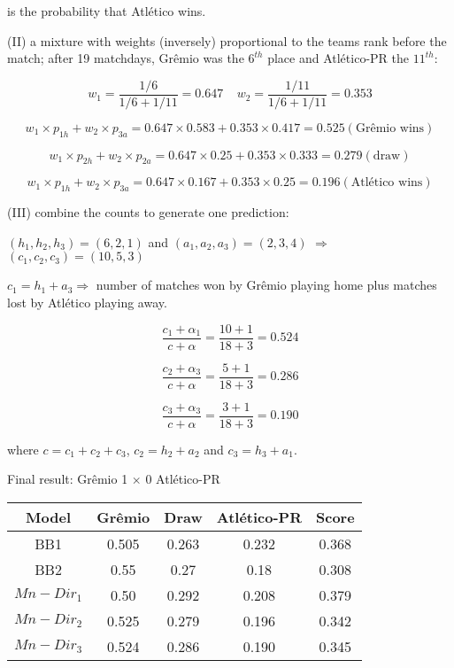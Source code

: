 \documentclass[journal,article,accept,moreauthors,pdftex,12pt,a4paper]{mdpi}
\begin{document}
\noindent
is the probability that Atl\'etico wins.


(II) a mixture with weights (inversely) proportional to the teams rank before the match; 
after 19 matchdays, Gr\^emio was the $6^{th}$ place and Atl\'etico-PR the $11^{th}$:


\[w_1 = \frac{1/6}{1/6+1/11}=0.647 ~ ~ ~ ~ ~ w_2 = \frac{1/11}{1/6+1/11}=0.353\]


\[
w_1\times p_{1h}+w_2\times p_{3a}=0.647\times0.583+0.353\times0.417=0.525 (\text{Gr\^emio wins})
\]

\[
w_1\times p_{2h}+w_2\times p_{2a}=0.647\times0.25+0.353\times0.333=0.279 (\text{draw})
\]

\[
w_1\times p_{1h}+w_2\times p_{3a}=0.647\times0.167+0.353\times0.25=0.196 (\text{Atl\'etico wins})
\]
    

(III) combine the counts to generate one prediction: 

$(h_1,h_2,h_3)=(6,2,1)$ and $(a_1,a_2,a_3)=(2,3,4)$ $\Rightarrow$ $(c_1,c_2,c_3)=(10,5,3)$


$c_1=h_1+a_3 \Rightarrow$ number of matches won by Gr\^emio playing home plus matches lost by Atl\'etico playing away.

\[\frac{c_1+\alpha_1}{c+\alpha}=\frac{10+1}{18+3}=0.524
\] 


\[\frac{c_2+\alpha_3}{c+\alpha}=\frac{5+1}{18+3}=0.286
\] 

\[\frac{c_3+\alpha_3}{c+\alpha}=\frac{3+1}{18+3}=0.190
\] 

\noindent
where $c=c_1+c_2+c_3$, $c_2=h_2+a_2$ and $c_3=h_3+a_1$.

Final result: Gr\^emio 1 $\times$ 0 Atl\'etico-PR

\begin{table}[h]
\begin{center}
\begin{tabular}{ccccc}

\hline
Model & Gr\^emio & Draw & Atl\'etico-PR & Score \\
\hline
\hline
BB1 & 0.505 & 0.263 & 0.232 & 0.368 \\
BB2 & 0.55 & 0.27 & 0.18 & 0.308 \\
$Mn-Dir_1$ & 0.50 & 0.292 & 0.208 & 0.379 \\
$Mn-Dir_2$ & 0.525 & 0.279 & 0.196 & 0.342\\
$Mn-Dir_3$ & 0.524 & 0.286 & 0.190 & 0.345\\
\hline
\end{tabular}
\end{center}
\end{table}
\end{document}

